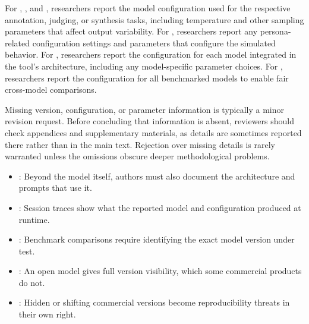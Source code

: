 For \annotators, \judges, and \synthesis, researchers \must report the model configuration used for the respective annotation, judging, or synthesis tasks, including temperature and other sampling parameters that affect output variability.
For \subjects, researchers \must report any persona-related configuration settings and parameters that configure the simulated behavior.
For \newtools, researchers \must report the configuration for each model integrated in the tool's architecture, including any model-specific parameter choices.
For \benchmarkingtasks, researchers \must report the configuration for all benchmarked models to enable fair cross-model comparisons.


Missing version, configuration, or parameter information is typically a minor revision request. Before concluding that information is absent, reviewers should check appendices and supplementary materials, as details are sometimes reported there rather than in the main text. Rejection over missing details is rarely warranted unless the omissions obscure deeper methodological problems.

\begin{itemize}[label=$\rightarrow$]
    \item \seedesign: Beyond the model itself, authors must also document the architecture and prompts that use it.
    \item \seetraces: Session traces show what the reported model and configuration produced at runtime.
    \item \seebenchmarksmetrics: Benchmark comparisons require identifying the exact model version under test.
    \item \seeopenllm: An open model gives full version visibility, which some commercial products do not.
    \item \seelimitationsmitigations: Hidden or shifting commercial versions become reproducibility threats in their own right.
\end{itemize}